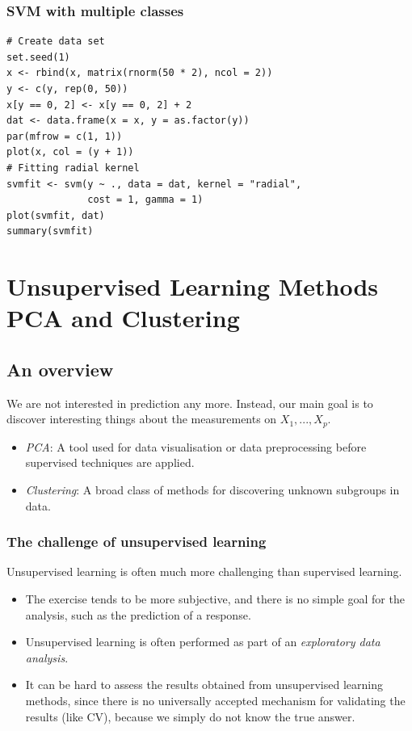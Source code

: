 \documentclass[11pt]{article}
\begin{document}
\subsubsection{SVM with multiple classes}
\begin{lstlisting}
# Create data set
set.seed(1)
x <- rbind(x, matrix(rnorm(50 * 2), ncol = 2))
y <- c(y, rep(0, 50))
x[y == 0, 2] <- x[y == 0, 2] + 2
dat <- data.frame(x = x, y = as.factor(y))
par(mfrow = c(1, 1))
plot(x, col = (y + 1))
# Fitting radial kernel
svmfit <- svm(y ~ ., data = dat, kernel = "radial", 
              cost = 1, gamma = 1)
plot(svmfit, dat)
summary(svmfit)
\end{lstlisting}

\newpage
\section{Unsupervised Learning Methods PCA and Clustering}
\subsection*{An overview}
\noindent We are not interested in prediction any more. Instead, our main goal is to discover interesting things about the measurements on $X_1,...,X_p$.
\begin{itemize}
    \item \textit{PCA}: A tool used for data visualisation or data preprocessing before supervised techniques are applied.
    \item \textit{Clustering}: A broad class of methods for discovering unknown subgroups in data.
\end{itemize}

\subsubsection*{The challenge of unsupervised learning}
\noindent Unsupervised learning is often much more challenging than supervised learning.
\begin{itemize}
    \item The exercise tends to be more subjective, and there is no simple goal for the analysis, such as the prediction of a response.
    \item Unsupervised learning is often performed as part of an \textit{exploratory data analysis}.
    \item It can be hard to assess the results obtained from unsupervised learning methods, since there is no universally accepted mechanism for validating the results (like CV), because we simply do not know the true answer.
\end{itemize}
\end{document}
